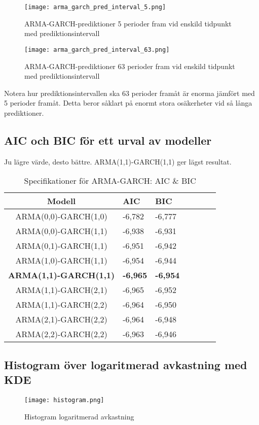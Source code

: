 \documentclass[11pt]{article}
\numberwithin{equation}{section}
\numberwithin{table}{section}
\numberwithin{figure}{section}
\begin{document}
\begin{figure}[H]
\caption{ARMA-GARCH-prediktioner 5 perioder fram vid enskild tidpunkt med prediktionsintervall}
\texttt{[image: arma\_garch\_pred\_interval\_5.png]}
\centering
\end{figure}

\begin{figure}[H]
\caption{ARMA-GARCH-prediktioner 63 perioder fram vid enskild tidpunkt med prediktionsintervall}
\texttt{[image: arma\_garch\_pred\_interval\_63.png]}
\centering
\end{figure}
Notera hur prediktionsintervallen ska 63 perioder framåt är enorma jämfört med 5 perioder framåt. Detta beror såklart på enormt stora osäkerheter vid så långa prediktioner.

\subsection{AIC och BIC för ett urval av modeller}
Ju lägre värde, desto bättre. ARMA(1,1)-GARCH(1,1) ger lägst resultat.

\begin{table}[H]
\caption{Specifikationer för ARMA-GARCH: AIC \& BIC}
\begin{tabularx}{\textwidth}{c *{6}{Y}}
\toprule
Modell  & AIC & BIC  \\
\hline

ARMA(0,0)-GARCH(1,0)            & -6,782                &   -6,777     \\

ARMA(0,0)-GARCH(1,1)            & -6,938         & -6,931    \\


ARMA(0,1)-GARCH(1,1)            & -6,951         & -6,942   \\

ARMA(1,0)-GARCH(1,1)           & -6,954         & -6,944   \\


\textbf{ARMA(1,1)-GARCH(1,1)}           & \textbf{-6,965}          & \textbf{-6,954}
    \\ 

ARMA(1,1)-GARCH(2,1)           & -6,965         & -6,952   \\ 

ARMA(1,1)-GARCH(2,2)           & -6,964        & -6,950
   \\ 

ARMA(2,1)-GARCH(2,2)           &-6,964        & -6,948    \\ 

ARMA(2,2)-GARCH(2,2)           & -6,963         &  -6,946
   \\ 

\bottomrule
\end{tabularx}
\end{table}

\vspace{0.5cm}
\subsection{Histogram över logaritmerad avkastning med KDE}
\begin{figure}[H]
\caption{Histogram logaritmerad avkastning}
\texttt{[image: histogram.png]}
\centering
\end{figure}
\end{document}
